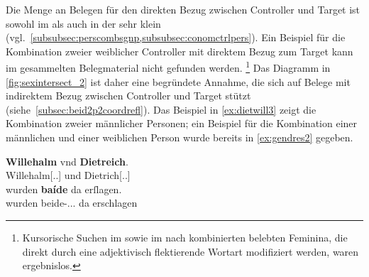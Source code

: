 Die Menge an Belegen für den direkten Bezug zwischen Controller und Target ist
sowohl im \CAO{} als auch in der \KC{} sehr klein
(vgl.~\cref{subsubsec:perscombsgnp,subsubsec:conomctrlpers}). Ein Beispiel für
die Kombination zweier weiblicher Controller mit direktem Bezug zum Target kann
im gesammelten Belegmaterial nicht gefunden werden.%
%
	\footnote{Kursorische Suchen im \CAO{} sowie im \REM{}
	nach kombinierten belebten Feminina, die direkt durch eine adjektivisch
	flektierende Wortart modifiziert werden, waren ergebnislos.}
%
Das Diagramm in \cref{fig:sexintersect_2} ist daher eine begründete Annahme, die
sich auf Belege mit indirektem Bezug zwischen Controller und Target stützt
(siehe~\cref{subsec:beid2p2coordrefl}). Das Beispiel in \cref{ex:dietwill3}
zeigt die Kombi\-nation zweier männlicher Personen; ein Beispiel für die
Kombination einer männlichen und einer weiblichen Person wurde bereits in
\cref{ex:gendres2} gegeben.

\begin{exe}
\ex\label{ex:dietwill3}
		\gll \textbf{Willehalm} vnd \textbf{Dietreich}. \\
			Willehalm[\Nom.\Sg.\MascM] und Dietrich[\Nom.\Sg.\MascM] \\
	\sn \gll wurden \textbf{baíde} da erſlagen. \\
			wurden beide-\Nom.\Pl.\MascM.\St{} da erschlagen \\

		\begin{taggedline}{\parencites[\pno~83\vb, 36--37]{kc:C1}[vgl.][\pno~95\vb, 12--13]{kc:K}}
		\trans {}
		\end{taggedline}
\end{exe}

